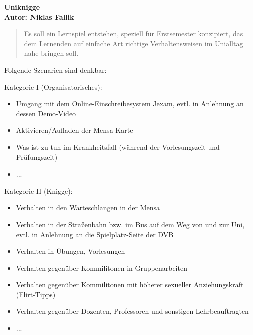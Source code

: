 \documentclass[a4paper,10pt]{article}
\begin{document}
\vspace*{1cm}

{\bfseries \large Uniknigge \\[1mm]		%
\normalfont Autor: Niklas Fallik}					%

\vspace{1cm}

\begin{abstract}					
	Es soll ein Lernspiel entstehen, speziell für Erstsemester konzipiert, das dem Lernenden auf einfache Art richtige Verhaltensweisen im Unialltag nahe bringen soll.
\end{abstract}
\vspace{1cm}

Folgende Szenarien sind denkbar:

Kategorie I (Organisatorisches):
\begin{itemize}
	\item Umgang mit dem Online-Einschreibesystem Jexam, evtl. in Anlehnung an dessen Demo-Video
	\item Aktivieren/Aufladen der Mensa-Karte
	\item Was ist zu tun im Krankheitsfall (während der Vorlesungszeit und Prüfungszeit)
	\item ...
\end{itemize}

Kategorie II (Knigge):
\begin{itemize}
	\item Verhalten in den Warteschlangen in der Mensa
	\item Verhalten in der Straßenbahn bzw. im Bus auf dem Weg von und zur Uni, evtl. in Anlehnung an
die \glqq Spielplatz\grqq-Seite der DVB
	\item Verhalten in Übungen, Vorlesungen
	\item Verhalten gegenüber Kommilitonen in Gruppenarbeiten
	\item Verhalten gegenüber Kommilitonen mit höherer sexueller Anziehungskraft (Flirt-Tipps)
	\item Verhalten gegenüber Dozenten, Professoren und sonstigen Lehrbeauftragten
	\item ...
\end{itemize}
\end{document}
